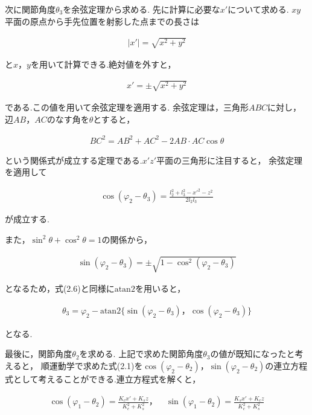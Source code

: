 次に関節角度$\theta_3$を余弦定理から求める.
先に計算に必要な$x'$について求める.
$xy$平面の原点から手先位置を射影した点までの長さは

\begin{align}
  |x'| = \sqrt{x^2 + y^2} \tag{2.7}
\end{align}

と$x， y$を用いて計算できる.絶対値を外すと，

\begin{align}
  x' = \pm \sqrt{x^2 + y^2} \tag{2.8}
\end{align}

である.この値を用いて余弦定理を適用する.
余弦定理は，三角形$ABC$に対し，辺$AB， AC$のなす角を$\theta$とすると，

\begin{align}
  BC^2 = AB^2 + AC^2 - 2 AB \cdot AC \cos \theta \tag{2.9}
\end{align}

という関係式が成立する定理である.$x'z'$平面の三角形に注目すると，
余弦定理を適用して

\begin{align}
  \cos(\varphi_2 - \theta_3) = \frac{l_2^2 + l_3^2 - x'^2 - z^2}{2 l_2 l_3} \tag{2.10}
\end{align}

が成立する.

また，$\sin^2 \theta + \cos^2 \theta = 1$の関係から，

\begin{align}
  \sin(\varphi_2 - \theta_3) = \pm \sqrt{1 - \cos^2 (\varphi_2 - \theta_3)} \tag{2.11}
\end{align}

となるため，式(2.6)と同様に$\text{atan2}$を用いると，

\begin{align}
  \theta_3 = \varphi_2 - \text{atan2} \{ \sin(\varphi_2 - \theta_3)， \cos(\varphi_2 - \theta_3) \} \tag{2.12}
\end{align}

となる.

最後に，関節角度$\theta_2$を求める.
上記で求めた関節角度$\theta_3$の値が既知になったと考えると，
順運動学で求めた式(2.1)を$\cos(\varphi_2 - \theta_2)， \sin(\varphi_2 - \theta_2)$の連立方程式として考えることができる.連立方程式を解くと，

\begin{align}
  \cos(\varphi_1 - \theta_2) = \frac{K_c x' + K_s z}{K_c^2 + K_s^2}， \quad \sin(\varphi_1 - \theta_2) = \frac{K_s x' + K_c z}{K_c^2 + K_s^2} \tag{2.13}
\end{align}

